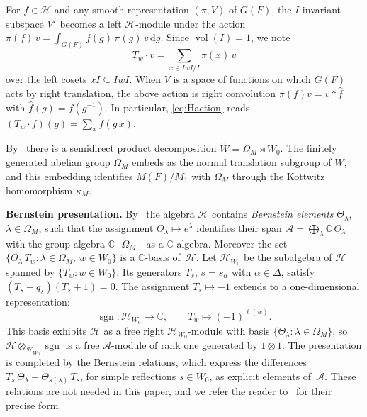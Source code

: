 \documentclass[11pt]{amsart}
\theoremstyle{definition}
\theoremstyle{remark}
\DeclareMathOperator{\sgn}{sgn}
\DeclareMathOperator{\vol}{vol}
\newcommand{\CC}{\mathbb{C}}
\newcommand{\HH}{\mathcal{H}}
\newcommand{\AAA}{\mathcal{A}}
\begin{document}
For $f\in\HH$ and any smooth representation $(\pi,V)$ of $G(F)$, the $I$-invariant subspace $V^I$ becomes a left $\HH$-module under the action $\pi(f)\,v = \int_{G(F)} f(g)\,\pi(g)\,v\,\mathrm{d}g$. Since $\vol(I) = 1$, we note
\begin{equation}\label{eq:Haction}
T_w\cdot v = \sum_{x\in IwI/I} \pi(x)\,v
\end{equation}
over the left cosets $xI\subseteq IwI$. When $V$ is a space of functions on which $G(F)$ acts by right translation, the above action is right convolution $\pi(f)v = v * \hat f$ with
$\hat f(g) = f(g^{-1})$. In particular, \eqref{eq:Haction} reads $(T_w\cdot f)(g) = \sum_{x} f(g\,x)$.

By~\cite[\S 2.9]{Rostami} there is a semidirect product decomposition $\widetilde{W} = \Omega_M \rtimes W_0$. The finitely generated abelian group $\Omega_M$ embeds as the normal translation subgroup of $\widetilde{W}$, and this embedding identifies $M(F)/M_1$ with $\Omega_M$ through the Kottwitz homomorphism $\kappa_M$.

\smallskip
\noindent\textbf{Bernstein presentation.} By~\cite[\S 5]{Rostami} the algebra $\HH$ contains \emph{Bernstein elements} $\Theta_\lambda$, $\lambda \in \Omega_M$, such that the assignment $\Theta_\lambda \mapsto e^\lambda$ identifies their span $\AAA = \bigoplus_{\lambda} \CC\,\Theta_\lambda$ with the group algebra $\CC[\Omega_M]$ as a $\CC$-algebra. Moreover the set $\{\Theta_\lambda\, T_w : \lambda \in \Omega_M,\, w \in W_0\}$ is a $\CC$-basis of~$\HH$. Let $\HH_{W_0}$ be the subalgebra of $\HH$ spanned by $\{T_w : w \in W_0\}$. Its generators $T_{s}$, $s = s_\alpha$ with $\alpha \in \Delta$, satisfy $(T_s - q_s)(T_s + 1) = 0$. The assignment $T_s \mapsto -1$ extends to a one-dimensional representation:
\[
\sgn \colon \HH_{W_0} \to \CC, \qquad T_w \mapsto (-1)^{\ell(w)}.
\]
This basis exhibits $\HH$ as a free right $\HH_{W_0}$-module with basis $\{\Theta_\lambda : \lambda \in \Omega_M\}$, so $\HH \otimes_{\HH_{W_0}} \sgn$ is a free $\AAA$-module of rank one generated by $1 \otimes 1$. The presentation is completed by the Bernstein relations, which express the differences $T_s\,\Theta_\lambda - \Theta_{s(\lambda)}\,T_s$, for simple reflections $s \in W_0$, as explicit elements of~$\AAA$. These relations are not needed in this paper, and we refer the reader to~\cite[\S 5.4]{Rostami} for their precise form.
\end{document}
